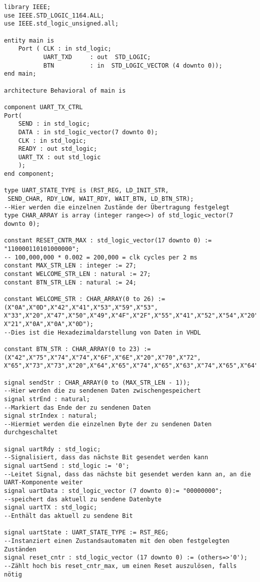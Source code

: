 \documentclass{article}
\begin{document}
\begin{verbatim}
library IEEE;
use IEEE.STD_LOGIC_1164.ALL;
use IEEE.std_logic_unsigned.all;

entity main is
    Port ( CLK : in std_logic;
           UART_TXD 	: out  STD_LOGIC;
           BTN 			: in  STD_LOGIC_VECTOR (4 downto 0));
end main;

architecture Behavioral of main is

component UART_TX_CTRL
Port(
	SEND : in std_logic;
	DATA : in std_logic_vector(7 downto 0);
	CLK : in std_logic;          
	READY : out std_logic;
	UART_TX : out std_logic
	);
end component;

type UART_STATE_TYPE is (RST_REG, LD_INIT_STR,
 SEND_CHAR, RDY_LOW, WAIT_RDY, WAIT_BTN, LD_BTN_STR);
--Hier werden die einzelnen Zustände der Übertragung festgelegt
type CHAR_ARRAY is array (integer range<>) of std_logic_vector(7 downto 0);

constant RESET_CNTR_MAX : std_logic_vector(17 downto 0) := "110000110101000000";
-- 100,000,000 * 0.002 = 200,000 = clk cycles per 2 ms
constant MAX_STR_LEN : integer := 27;
constant WELCOME_STR_LEN : natural := 27;
constant BTN_STR_LEN : natural := 24;

constant WELCOME_STR : CHAR_ARRAY(0 to 26) := (X"0A",X"0D",X"42",X"41",X"53",X"59",X"53",
X"33",X"20",X"47",X"50",X"49",X"4F",X"2F",X"55",X"41",X"52",X"54",X"20",X"44",X"45",X"4D",X"4F",
X"21",X"0A",X"0A",X"0D");
--Dies ist die Hexadezimaldarstellung von Daten in VHDL

constant BTN_STR : CHAR_ARRAY(0 to 23) := (X"42",X"75",X"74",X"74",X"6F",X"6E",X"20",X"70",X"72",
X"65",X"73",X"73",X"20",X"64",X"65",X"74",X"65",X"63",X"74",X"65",X"64",X"21",X"0A",X"0D");

signal sendStr : CHAR_ARRAY(0 to (MAX_STR_LEN - 1));
--Hier werden die zu sendenen Daten zwischengespeichert
signal strEnd : natural;
--Markiert das Ende der zu sendenen Daten
signal strIndex : natural;
--Hiermiet werden die einzelnen Byte der zu sendenen Daten durchgeschaltet

signal uartRdy : std_logic;
--Signalisiert, dass das nächste Bit gesendet werden kann
signal uartSend : std_logic := '0';
--Leitet Signal, dass das nächste bit gesendet werden kann an, an die UART-Komponente weiter
signal uartData : std_logic_vector (7 downto 0):= "00000000";
--speichert das aktuell zu sendene Datenbyte
signal uartTX : std_logic;
--Enthält das aktuell zu sendene Bit

signal uartState : UART_STATE_TYPE := RST_REG;
--Instanziert einen Zustandsautomaten mit den oben festgelegten Zuständen
signal reset_cntr : std_logic_vector (17 downto 0) := (others=>'0');
--Zählt hoch bis reset_cntr_max, um einen Reset auszulösen, falls nötig


\end{verbatim}
\end{document}
